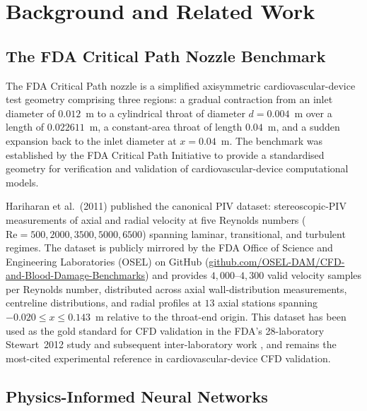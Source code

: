 \documentclass[12pt,a4paper]{article}
\newcommand{\Reyn}{\mathrm{Re}}    %
\begin{document}
\section{Background and Related Work}
\label{sec:background}

\subsection{The FDA Critical Path Nozzle Benchmark}
\label{sec:fda_benchmark}

The FDA Critical Path nozzle is a simplified axisymmetric
cardiovascular-device test geometry comprising three regions: a
gradual contraction from an inlet diameter of $0.012$~m to a
cylindrical throat of diameter $d = 0.004$~m over a length of
$0.022611$~m, a constant-area throat of length $0.04$~m, and a
sudden expansion back to the inlet diameter at $x = 0.04$~m. The
benchmark was established by the FDA Critical Path Initiative
\cite{FDA2009Nozzle, FDACriticalPath2004} to provide a standardised
geometry for verification and validation of cardiovascular-device
computational models.

Hariharan et al.\ (2011) \cite{Hariharan2011FDA} published the
canonical PIV dataset: stereoscopic-PIV measurements of axial and
radial velocity at five Reynolds numbers
($\Reyn = 500, 2000, 3500, 5000, 6500$) spanning laminar,
transitional, and turbulent regimes. The dataset is publicly
mirrored by the FDA Office of Science and Engineering Laboratories
(OSEL) on GitHub
(\url{github.com/OSEL-DAM/CFD-and-Blood-Damage-Benchmarks}) and
provides $4{,}000$--$4{,}300$ valid velocity samples per Reynolds
number, distributed across axial wall-distribution measurements,
centreline distributions, and radial profiles at $13$ axial
stations spanning $-0.020 \leq x \leq 0.143$~m relative to the
throat-end origin. This dataset has been used as the gold standard
for CFD validation in the FDA's 28-laboratory Stewart~2012 study
\cite{Stewart2012FDA} and subsequent inter-laboratory work
\cite{Steinman2013FDA}, and remains the most-cited experimental
reference in cardiovascular-device CFD validation.

\subsection{Physics-Informed Neural Networks}
\label{sec:pinn_background}
\end{document}
